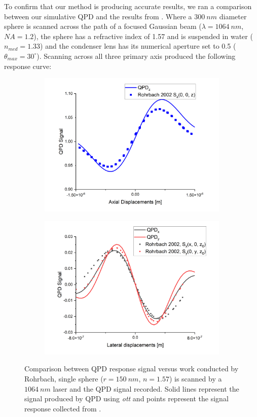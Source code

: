 To confirm that our method is producing accurate results, we ran a comparison
between our simulative QPD and the results from \cite{Rohrbach2002}. Where a 
$300\ nm$ diameter sphere is scanned across the path of a focused Gaussian beam
($\lambda=1064\ nm$, $NA=1.2$), the sphere has a refractive index of 1.57 and is
suspended in water ($n_{med}=1.33$) and the condenser lens has its numerical aperture
set to 0.5 ($\theta_{max} = 30^\circ$). Scanning across all three primary axis 
produced the following response curve:
\begin{figure}[h!]
	\begin{subfigure}{0.475 \linewidth}
		\subcaption{}
		\includegraphics[width=\linewidth]{QPD_axial_tests.png}
	\end{subfigure}
	\begin{subfigure}{0.475 \linewidth}
		\subcaption{}
		\includegraphics[width=\linewidth]{QPD_lat_tests.png}
	\end{subfigure}
	\caption{Comparison between QPD response signal versus work conducted by 
		Rohrbach, single sphere ($r = 150\ nm$, $n=1.57$) is scanned by a $1064\ nm$ laser and the QPD signal recorded. Solid lines represent the signal 
		produced by QPD using \textit{ott} and points represent the signal 
		response collected from \cite{Rohrbach2002}.}
	\label{fig:Rohrbach}
\end{figure}

